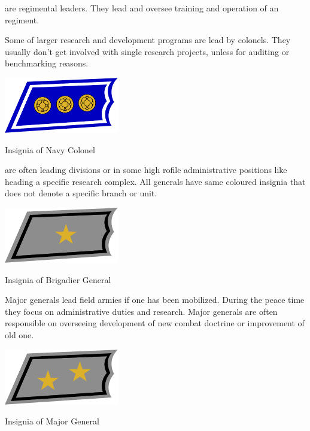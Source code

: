 \documentclass{tufte-book}
\begin{document}

 are regimental leaders. They lead and oversee training
and operation of an regiment.

Some of larger research and development programs are lead by colonels. They
usually don't get involved with single research projects, unless for auditing
or benchmarking reasons.

\begin{marginfigure}[0\baselineskip]
  \includegraphics[width=5.0cm]{rank-colonel}
  \caption{Insignia of Navy Colonel}
  \label{fig:insignia_colonel}
\end{marginfigure}

 are often leading divisions or in some high 
rofile administrative positions like heading a specific research complex.
All generals have same coloured insignia that does not denote a specific
branch or unit.

\begin{marginfigure}[0\baselineskip]
  \includegraphics[width=5.0cm]{rank-brigadier-general}
  \caption{Insignia of Brigadier General}
  \label{fig:insignia_brigadier_general}
\end{marginfigure}


Major generals lead field armies if one has been mobilized. During the peace
time they focus on administrative duties and research. Major generals are
often responsible on overseeing development of new combat doctrine or
improvement of old one.

\begin{marginfigure}[0\baselineskip]
  \includegraphics[width=5.0cm]{rank-major-general}
  \caption{Insignia of Major General}
  \label{fig:insignia_major_general}
\end{marginfigure}
\end{document}
